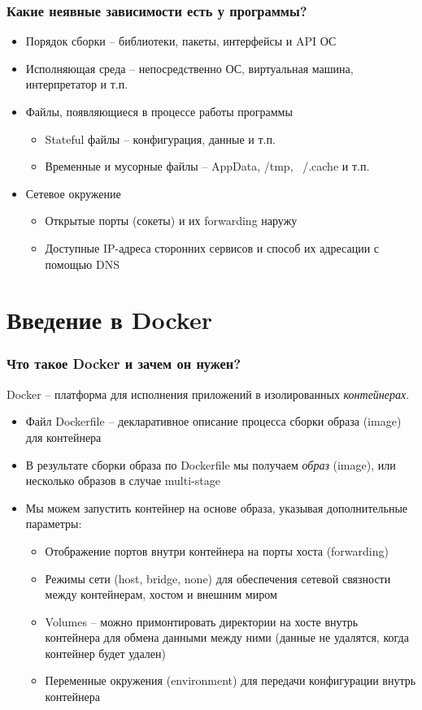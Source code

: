 \documentclass{beamer}
\begin{document}
\begin{frame}
\frametitle{Какие неявные зависимости есть у программы?}

\begin{itemize}
	\item Порядок сборки – библиотеки, пакеты, интерфейсы и API ОС
	\item Исполняющая среда – непосредственно ОС, виртуальная машина, интерпретатор и т.п.
	\item Файлы, появляющиеся в процессе работы программы
	\begin{itemize}
        \item Stateful файлы – конфигурация, данные и т.п.
        \item Временные и мусорные файлы – AppData, /tmp, ~/.cache и т.п.
    \end{itemize}
    \item Сетевое окружение
    \begin{itemize}
        \item Открытые порты (сокеты) и их forwarding наружу
        \item Доступные IP-адреса сторонних сервисов и способ их адресации с помощью DNS
    \end{itemize}
\end{itemize}

\end{frame}

\section{Введение в Docker}

\begin{frame}
\frametitle{Что такое Docker и зачем он нужен?}

Docker – платформа для исполнения приложений в изолированных {\itshape контейнерах}.

\begin{itemize}
	\item Файл Dockerfile – декларативное описание процесса сборки образа (image) для контейнера
	\item В результате сборки образа по Dockerfile мы получаем {\itshape образ} (image), или несколько образов в случае multi-stage
    \item Мы можем запустить контейнер на основе образа, указывая дополнительные параметры:
    \begin{itemize}
        \item Отображение портов внутри контейнера на порты хоста (forwarding)
        \item Режимы сети (host, bridge, none) для обеспечения сетевой связности между контейнерам, хостом и внешним миром
        \item Volumes – можно примонтировать директории на хосте внутрь контейнера для обмена данными между ними (данные не удалятся, когда контейнер будет удален)
        \item Переменные окружения (environment) для передачи конфигурации внутрь контейнера
    \end{itemize}
\end{itemize}

\end{frame}
\end{document}
